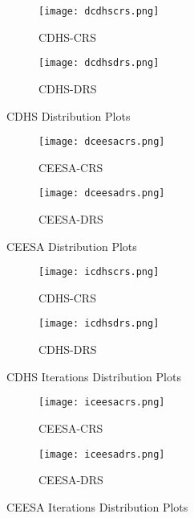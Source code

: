 \documentclass[10pt]{article}
\begin{document}
\begin{figure}
  \centering
  \begin{subfigure}[b]{0.3\textwidth}
    \texttt{[image: dcdhscrs.png]}
    \caption{CDHS-CRS}\label{fig:distcdcrs}
  \end{subfigure}
  \qquad
  \begin{subfigure}[b]{0.3\textwidth}
    \texttt{[image: dcdhsdrs.png]}
    \caption{CDHS-DRS}\label{fig:distcddrs}
  \end{subfigure}
  \caption{CDHS Distribution Plots}\label{fig:distcdhs}
\end{figure}


\begin{figure}
  \centering
  \begin{subfigure}[b]{0.4\textwidth}
    \texttt{[image: dceesacrs.png]}
    \caption{CEESA-CRS}\label{fig:distcecrs}
  \end{subfigure}
  \qquad
  \begin{subfigure}[b]{0.4\textwidth}
    \texttt{[image: dceesadrs.png]}
    \caption{CEESA-DRS}\label{fig:distcedrs}
  \end{subfigure}
  \caption{CEESA Distribution Plots}\label{fig:distceesa}
\end{figure}


\begin{figure}
  \centering
  \begin{subfigure}[b]{0.4\textwidth}
    \texttt{[image: icdhscrs.png]}
    \caption{CDHS-CRS}\label{fig:itercdcrs}
  \end{subfigure}
  \qquad
  \begin{subfigure}[b]{0.4\textwidth}
    \texttt{[image: icdhsdrs.png]}
    \caption{CDHS-DRS}\label{fig:itercddrs}
  \end{subfigure}
  \caption{CDHS Iterations Distribution Plots}\label{fig:itercdhs}
\end{figure}


\begin{figure}
  \centering
  \begin{subfigure}[b]{0.4\textwidth}
    \texttt{[image: iceesacrs.png]}
    \caption{CEESA-CRS}\label{fig:itercecrs}
  \end{subfigure}
  \qquad
  \begin{subfigure}[b]{0.4\textwidth}
    \texttt{[image: iceesadrs.png]}
    \caption{CEESA-DRS}\label{fig:itercedrs}
  \end{subfigure}
  \caption{CEESA Iterations Distribution Plots}\label{fig:iterceesa}
\end{figure}
\end{document}
